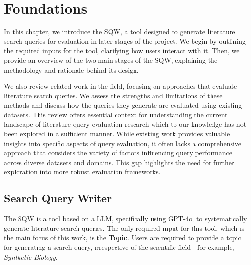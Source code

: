 {\let\clearpage\relax \chapter{Foundations}\label{ch:foundations}}
In this chapter, we introduce the SQW, a tool designed to generate literature search queries for evaluation in later stages of the project. We begin by outlining the required inputs for the tool, clarifying how users interact with it. Then, we provide an overview of the two main stages of the SQW, explaining the methodology and rationale behind its design.

We also review related work in the field, focusing on approaches that evaluate literature search queries. We assess the strengths and limitations of these methods and discuss how the queries they generate are evaluated using existing datasets. This review offers essential context for understanding the current landscape of literature query evaluation research which to our knowledge has not been explored in a sufficient manner. While existing work provides valuable insights into specific aspects of query evaluation, it often lacks a comprehensive approach that considers the variety of factors influencing query performance across diverse datasets and domains. This gap highlights the need for further exploration into more robust evaluation frameworks.


\section{Search Query Writer}\label{sec:sqw}
The SQW is a tool based on a LLM, specifically using GPT-4o, to systematically generate literature search queries. The only required input for this tool, which is the main focus of this work, is the \textbf{Topic}. Users are required to provide a topic for generating a search query, irrespective of the scientific field—for example, \textit{Synthetic Biology}. 


